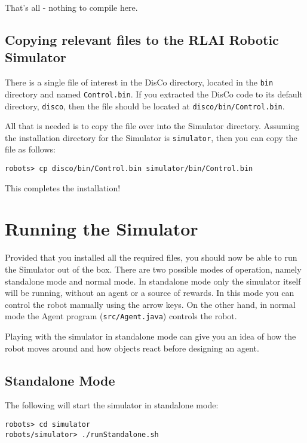 \documentclass[12pt]{article}
\begin{document}
That's all - nothing to compile here.

\subsection{Copying relevant files to the RLAI Robotic Simulator}

There is a single file of interest in the DisCo directory, located in the
\verb+bin+ directory and named \verb+Control.bin+. If you extracted the 
DisCo code to its default directory, \verb+disco+, then the file should 
be located at \verb+disco/bin/Control.bin+.

All that is needed is to copy the file over into the Simulator directory.
Assuming the installation directory for the Simulator is \verb+simulator+,
then you can copy the file as follows:

\begin{verbatim}
robots> cp disco/bin/Control.bin simulator/bin/Control.bin
\end{verbatim}

This completes the installation! 

\section{Running the Simulator}

Provided that you installed all the required files, you should now be able to
run the Simulator out of the box. There are two possible modes of operation,
namely standalone mode and normal mode. In standalone mode only the simulator
itself will be running, without an agent or a source of rewards. In this mode
you can control the robot manually using the arrow keys. On the other hand,
in normal mode the Agent program (\verb+src/Agent.java+) controls the robot.

Playing with the simulator in standalone mode can give you an idea of how the
robot moves around and how objects react before designing an agent.

\subsection{Standalone Mode}\label{subsec:standalone}

The following will start the simulator in standalone mode:

\begin{verbatim}
robots> cd simulator 
robots/simulator> ./runStandalone.sh
\end{verbatim}
\end{document}
